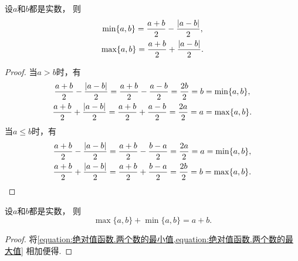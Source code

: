 \begin{proposition}
设\(a\)和\(b\)都是实数，
则\begin{gather}
	\min\{a,b\}
	= \frac{a+b}{2}
	- \frac{\abs{a-b}}{2},
		\label{equation:绝对值函数.两个数的最小值} \\
	\max\{a,b\}
	= \frac{a+b}{2}
	+ \frac{\abs{a-b}}{2}.
		\label{equation:绝对值函数.两个数的最大值}
\end{gather}
\begin{proof}
当\(a>b\)时，有\begin{gather*}
	\frac{a+b}{2} - \frac{\abs{a-b}}{2}
	= \frac{a+b}{2} - \frac{a-b}{2}
	= \frac{2b}{2} = b
	= \min\{a,b\}, \\
	\frac{a+b}{2} + \frac{\abs{a-b}}{2}
	= \frac{a+b}{2} + \frac{a-b}{2}
	= \frac{2a}{2} = a
	= \max\{a,b\}.
\end{gather*}
当\(a \leq b\)时，有\begin{gather*}
	\frac{a+b}{2} - \frac{\abs{a-b}}{2}
	= \frac{a+b}{2} - \frac{b-a}{2}
	= \frac{2a}{2} = a
	= \min\{a,b\}, \\
	\frac{a+b}{2} + \frac{\abs{a-b}}{2}
	= \frac{a+b}{2} + \frac{b-a}{2}
	= \frac{2b}{2} = b
	= \max\{a,b\}.
	\qedhere
\end{gather*}
\end{proof}
\end{proposition}

\begin{corollary}
设\(a\)和\(b\)都是实数，
则\begin{equation}
	\max\{a,b\} + \min\{a,b\} = a + b.
		\label{equation:绝对值函数.两个数的最小值最大值的关联}
\end{equation}
\begin{proof}
将\cref{equation:绝对值函数.两个数的最小值,equation:绝对值函数.两个数的最大值}
相加便得.
\end{proof}
\end{corollary}
